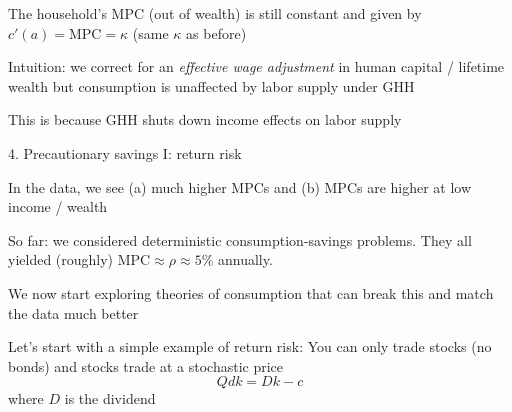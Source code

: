 \documentclass[11pt, aspectratio=169]{beamer}
\newenvironment{witemize}{\itemize\addtolength{\itemsep}{10pt}}{\enditemize}
\begin{document}
\begin{frame}{}
\begin{witemize}
\item The household's MPC (out of wealth) is still constant and given by $c'(a) = \text{MPC} = \kappa$ (same $\kappa$ as before)

\item Intuition: we correct for an \textit{effective wage adjustment} in human capital / lifetime wealth but consumption is unaffected by labor supply under GHH

\item This is because GHH shuts down income effects on labor supply

\end{witemize}
\end{frame}




\begin{frame}{4. Precautionary savings I: return risk}
\begin{witemize}
\item In the data, we see (a) much higher MPCs and (b) MPCs are higher at low income / wealth

\item So far: we considered deterministic consumption-savings problems. They all yielded (roughly) $\text{MPC} \approx \rho \approx 5\%$ annually. 

\item We now start exploring theories of consumption that can break this and match the data much better

\item Let's start with a simple example of return risk: You can only trade stocks (no bonds) and stocks trade at a stochastic price
\begin{equation*}
	Q dk = Dk - c
\end{equation*}
where $D$ is the dividend
\end{witemize}
\end{frame}
\end{document}
